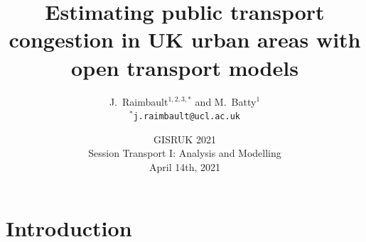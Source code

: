 



\title
[Open transportation models]{Estimating public transport congestion in UK urban areas with open transport models}
\author[Raimbault]{J.~Raimbault$^{1,2,3,\ast}$ and M.~Batty$^{1}$\\\medskip
$^{\ast}$\texttt{j.raimbault@ucl.ac.uk}
}





\date[14/04/2021]{GISRUK 2021\\
Session Transport I: Analysis and Modelling\\
April 14th, 2021\\
}

\frame{\maketitle}



\section{Introduction}


